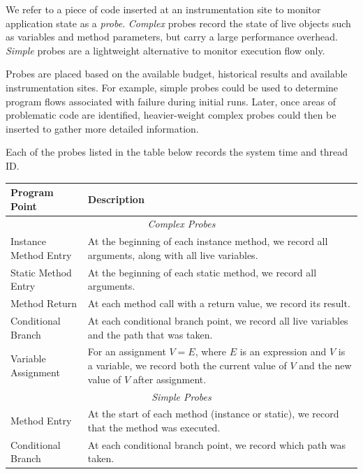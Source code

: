 {We refer to a piece of code inserted at an instrumentation site to monitor
application state as a \textit{probe}. \textit{Complex} probes record the
state of live objects such as variables and method parameters, but carry a large
performance overhead. \textit{Simple} probes are a lightweight alternative to
monitor execution flow only.

Probes are placed based on the available budget, historical results and
available instrumentation sites. For example, simple probes could be used to
determine program flows associated with failure during initial runs. Later,
once areas of problematic code are identified, heavier-weight complex probes
could then be inserted to gather more detailed information.

Each of the probes listed in the table below records the system time and thread
ID.

\begin{center}
    \begin{tabular}{| l | p{6cm} |}
    \hline
        \textbf{Program Point} & \textbf{Description} \\
    \hline
        \multicolumn{2}{|c|}{\textit{Complex Probes}} \\
    \hline
        Instance Method Entry &
        At the beginning of each instance method, we record all arguments, along
        with all live variables. \\
    \hline
    		Static Method Entry &
        At the beginning of each static method, we record all arguments. \\
    \hline
        Method Return &
        At each method call with a return value, we record its result. \\
    \hline
        Conditional Branch &
        At each conditional branch point, we record all live variables and the
        path that was taken. \\
    \hline
        Variable Assignment &
        For an assignment $V = E$, where $E$ is an expression and $V$ is a
        variable, we record both the current value of $V$ and the new value of
        $V$ after assignment. \\
    \hline
        \multicolumn{2}{|c|}{\textit{Simple Probes}} \\
    \hline
        Method Entry &
        At the start of each method (instance or static), we record that the
        method was executed. \\
    \hline
    		Conditional Branch &
        At each conditional branch point, we record which path was taken. \\
    \hline


\end{tabular}
\end{center}}
